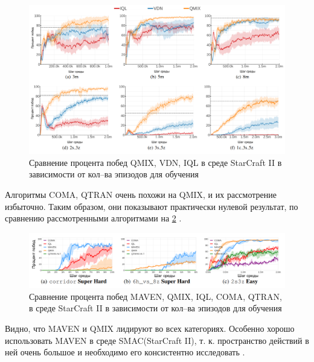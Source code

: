 \begin{figure}[H]
	\begin{center}
	\includegraphics[pages=-, width=140mm]{./inc/img/qmix_winrate.png}
	\caption{Сравнение процента побед QMIX, VDN, IQL в среде StarCraft II в зависимости от кол--ва эпизодов для обучения}
	\label{fig:qmix_winrate}
\end{center}
\end{figure}

Алгоритмы COMA, QTRAN очень похожи на QMIX, и их рассмотрение избыточно. Таким образом, они показывают практически нулевой результат, по сравнению рассмотренными алгоритмами на \ref{fig:maven_winrate} \cite{DBLP:journals/corr/abs-1910-07483}.

\begin{figure}[H]
	\begin{center}
	\includegraphics[pages=-, width=140mm]{./inc/img/maven_winrate.png}
	\caption{Сравнение процента побед MAVEN, QMIX, IQL, COMA, QTRAN, в среде StarCraft II в зависимости от кол--ва эпизодов для обучения}
	\label{fig:maven_winrate}
\end{center}
\end{figure}

Видно, что MAVEN и QMIX лидируют во всех категориях. Особенно хорошо использовать MAVEN в среде SMAC(StarCraft II), т. к. пространство действий в ней очень большое и необходимо его консистентно исследовать \cite{DBLP:journals/corr/abs-1910-07483}.

